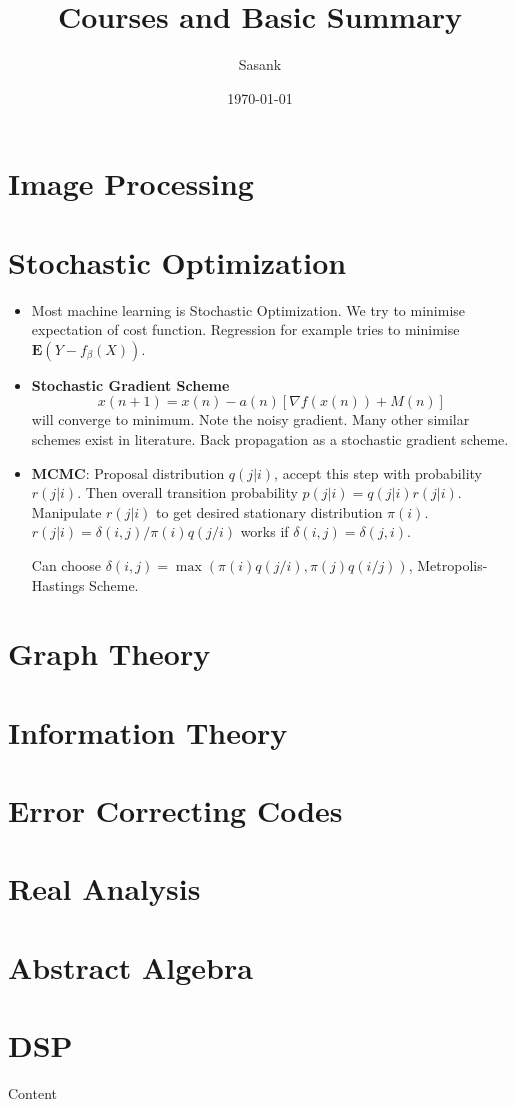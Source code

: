 \documentclass[a4paper]{article}
\begin{document}
\title{Courses and Basic Summary}
\author{Sasank}
\date{\today}
\maketitle
\tableofcontents

\section{Image Processing}

\section{Stochastic Optimization}
\begin{itemize}
\item Most machine learning is Stochastic Optimization. We try to minimise expectation of cost function. Regression for example tries to minimise $\mathbf{E}(Y - f_\beta(X))$.

\item \textbf{Stochastic Gradient Scheme}
\[x(n+1) = x(n) - a(n)[\nabla f(x(n)) + M(n)] \]
will converge to minimum. Note the noisy gradient. Many other similar schemes exist in literature. Back propagation as a stochastic gradient scheme.

\item \textbf{MCMC}: Proposal distribution $q(j|i)$, accept this step with probability $r(j|i)$. Then overall transition probability $p(j|i) = q(j|i)r(j|i)$. 
Manipulate $r(j|i)$ to get desired stationary distribution $\pi(i)$. $r(j|i) = \delta(i,j)/\pi(i)q(j/i)$ works if $\delta(i,j) = \delta(j,i)$. 

Can choose $\delta(i,j) = \max(\pi(i)q(j/i),\pi(j)q(i/j))$, Metropolis-Hastings Scheme.


\end{itemize}
\section{Graph Theory}

\section{Information Theory}

\section{Error Correcting Codes}

\section{Real Analysis}

\section{Abstract Algebra}

\section{DSP}


Content
\end{document}
